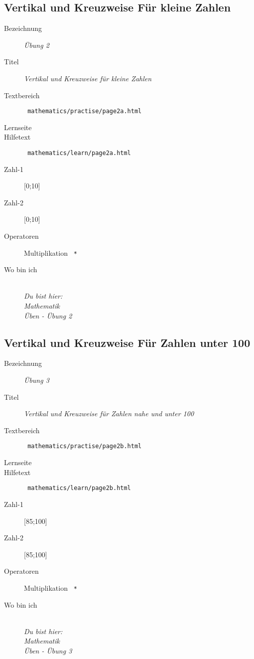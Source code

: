 \subsection{ Vertikal und Kreuzweise Für kleine Zahlen }
\label{cha:math-practise-page2}
\begin{description}
  \item[Bezeichnung] \emph{ Übung 2 }
  \item[Titel] \emph{ Vertikal und Kreuzweise für kleine Zahlen }
  \item[Textbereich] \texttt{ mathematics/practise/page2a.html }
  \item[Lernseite] 
  \item[Hilfetext] \texttt{ mathematics/learn/page2a.html }
  \item[Zahl-1] [0;10]
  \item[Zahl-2] [0;10]
  \item[Operatoren] Multiplikation \texttt{ * }
  \item[Wo bin ich] \emph{\\Du bist hier:\\Mathematik\\Üben - Übung 2}
\end{description}



\subsection{ Vertikal und Kreuzweise Für Zahlen unter 100 }
\label{cha:math-practise-page3}
\begin{description}
  \item[Bezeichnung] \emph{ Übung 3 }
  \item[Titel] \emph{ Vertikal und Kreuzweise für Zahlen nahe und unter 100 }
  \item[Textbereich] \texttt{ mathematics/practise/page2b.html }
  \item[Lernseite] 
  \item[Hilfetext] \texttt{ mathematics/learn/page2b.html }
  \item[Zahl-1] [85;100]
  \item[Zahl-2] [85;100]
  \item[Operatoren] Multiplikation \texttt{ * }
  \item[Wo bin ich] \emph{\\Du bist hier:\\Mathematik\\Üben - Übung 3}
\end{description}



